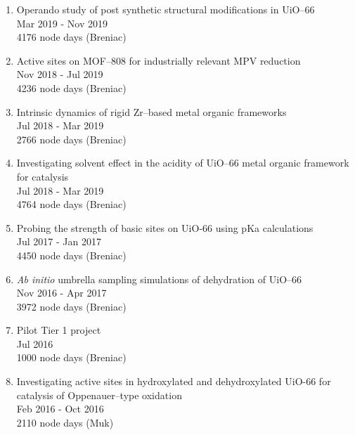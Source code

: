 \begin{enumerate}
\item
Operando study of post synthetic structural modifications in UiO--66\\
Mar 2019 - Nov 2019\\
4176 node days (Breniac)

\item
Active sites on MOF--808 for industrially relevant MPV reduction\\
Nov 2018 - Jul 2019\\
4236 node days (Breniac)

\item
Intrinsic dynamics of rigid Zr--based metal organic frameworks\\
Jul 2018 - Mar 2019\\
2766 node days (Breniac)

\item
Investigating solvent effect in the acidity of UiO--66 metal organic framework for catalysis\\
Jul 2018 - Mar 2019\\
4764 node days (Breniac)

\item
Probing the strength of basic sites on UiO-66 using pKa calculations\\
Jul 2017 - Jan 2017\\
4450 node days (Breniac)

\item
\textit{Ab initio} umbrella sampling simulations of dehydration of UiO--66\\
Nov 2016 - Apr 2017\\
3972 node days (Breniac)

\item
Pilot Tier 1 project\\
Jul 2016\\
1000 node days (Breniac)

\item
Investigating active sites in hydroxylated and dehydroxylated UiO-66 for catalysis of Oppenauer--type oxidation\\
Feb 2016 - Oct 2016\\
2110 node days (Muk)

\end{enumerate}
\clearpage{\pagestyle{empty}\cleardoublepage}
